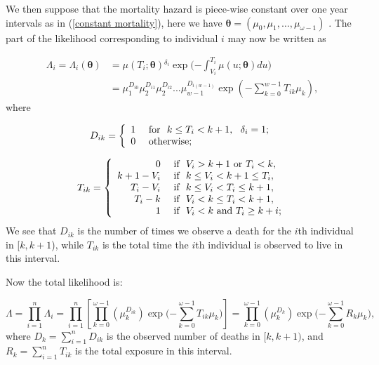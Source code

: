 We then suppose that the mortality hazard is piece-wise constant over  one year intervals as in (\ref{constant mortality}), here we have
${\bm{\theta}} = (\mu_{0},\mu_{1},\dots,\mu_{\omega - 1})$ .
The part of the likelihood corresponding to individual $ i $ may now be written as 


\begin{align*}
   \Lambda_i = \Lambda_i (\bm{\theta})
   &= {\mu( T_i;\bm{\theta}){^{\delta_{i}} \exp({{-\int_{V_i}^{T_i} \mu(u;\bm{\theta})du} } }}) \\
   &= \mu_1^{D_{i0}} \mu_2^{D_{i1}} \mu_2^{D_{i2}}...\mu_{w-1}^{D_{i(w-1)}}
   \exp({-\sum\limits_{k=0}^{w-1}  T_{ik} \mu_k }),
\end{align*}
where


\begin{equation*}
   D_{ik}= 
\left\{\begin{array}{rl}
 1 & \mbox{ for~~$ k \leq T_i < k+1, ~~\delta_{i}= 1$;} \\
 0 & \mbox{ otherwise}; 
       \end{array} \right. 
\end{equation*}


\begin{equation*}
   T_{ik}= 
\left\{\begin{array}{rl}
0 & \mbox{  if~~$ V_i > k+1$ or $T_i < k  $},\\
k+1 - V_i & \mbox{ if~~$  k \leq V_i < k+1 \leq T_i $}, \\
T_i - V_i & \mbox{ if~~$  k \leq V_i < T_i \leq k+1 $}, \\
T_i - k & \mbox{ if~~$    V_i< k \leq T_i < k+1 $}, \\
1 & \mbox{ if~~$  V_i < k $ and $ T_i \geq k+i$};   
     \end{array} \right. 
\end{equation*}
We see that $D_{ik}$ is the number of times we observe a death for the $i$th individual in [$k,k+1$), while $T_{ik}$ is the total time the $i$th individual is observed to live in this interval.

Now the total likelihood is: 


\begin{equation*}
    \Lambda = \prod\limits_{i=1}^n \Lambda_i =
    \prod\limits_{i=1}^n  [\prod\limits_{k=0}^{\omega-1} (\mu_k^{D_{ik}}) \exp{({-\sum\limits_{k=0}^{\omega -1} T_{ik}\mu_k}}) ]
    = \prod\limits_{k=0}^{\omega -1}(\mu_k^{D_k}) 
    \exp({{-\sum\limits_{k=0}^{\omega -1} R_k\mu_k})} ,
\end{equation*}
where $ D_k =\sum\limits_{i=1}^n D_{ik}$ is the observed number of deaths in $[k, k+1)$, and $R_k =\sum\limits_{i=1}^n T_{ik}$ is the total exposure in this interval. 

